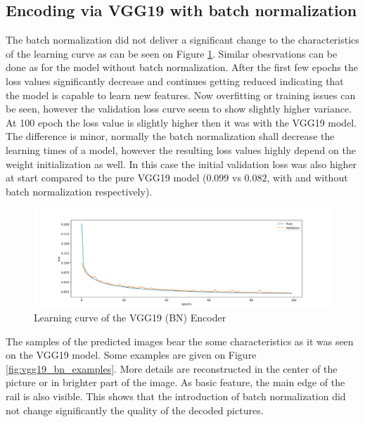 \subsection{Encoding via VGG19 with batch normalization}
The batch normalization did not deliver a significant change to the characteristics of the learning
curve as can be seen on Figure \ref{fig:vgg19_bn_learning_curve}.
Similar obesrvations can be done as for the model without batch normalization.
After the first few epochs the loss values significantly decrease and continues getting reduced
indicating that the model is capable to learn new features.
Now overfitting or training issues can be seen, however the validation loss curve seem to show
slightly higher variance.
At 100 epoch the loss value is slightly higher then it was with the VGG19 model.
The difference is minor, normally the batch normalization shall decrease the learning times of a model,
however the resulting loss values highly depend on the weight initialization as well.
In this case the initial validation loss was also higher at start compared to the pure VGG19 model
($0.099$ vs $0.082$, with and without batch normalization respectively).

\begin{figure}[!ht]
    \centering
    \includegraphics[width=\textwidth,trim={0 1cm 0 1cm},clip]{./results/vgg19_bn_vgg19/20230525_045131_results.png}
    \caption{Learning curve of the VGG19 (BN) Encoder}
    \label{fig:vgg19_bn_learning_curve}
\end{figure}

The samples of the predicted images bear the some characteristics as it was seen on the VGG19 model.
Some examples are given on Figure \ref{fig:vgg19_bn_examples}.
More details are reconstructed in the center of the picture or in brighter part of the image.
As basic feature, the main edge of the rail is also visible.
This shows that the introduction of batch normalization did not change significantly the quality of
the decoded pictures.

